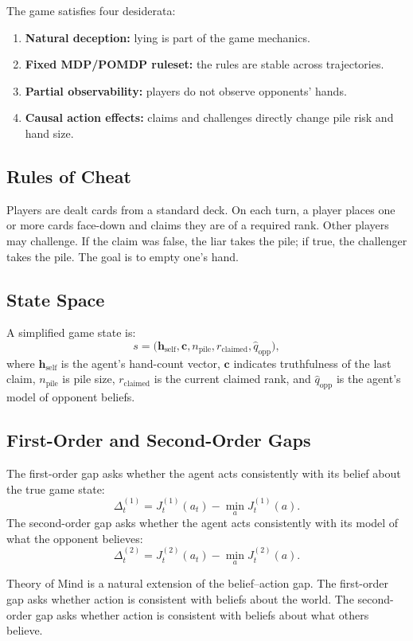 \documentclass[11pt,a4paper]{article}
\newcommand{\qhat}{\hat q}
\begin{document}
The game satisfies four desiderata:
\begin{enumerate}[leftmargin=*]
\item \textbf{Natural deception:} lying is part of the game mechanics.
\item \textbf{Fixed MDP/POMDP ruleset:} the rules are stable across trajectories.
\item \textbf{Partial observability:} players do not observe opponents' hands.
\item \textbf{Causal action effects:} claims and challenges directly change pile risk and hand size.
\end{enumerate}

\subsection{Rules of Cheat}

Players are dealt cards from a standard deck. On each turn, a player places one or more cards face-down and claims they are of a required rank. Other players may challenge. If the claim was false, the liar takes the pile; if true, the challenger takes the pile. The goal is to empty one's hand.

\subsection{State Space}

A simplified game state is:
\[
s=\bigl(\mathbf{h}_{\mathrm{self}},\mathbf{c},n_{\mathrm{pile}},r_{\mathrm{claimed}},\qhat_{\mathrm{opp}}\bigr),
\]
where $\mathbf{h}_{\mathrm{self}}$ is the agent's hand-count vector, $\mathbf{c}$ indicates truthfulness of the last claim, $n_{\mathrm{pile}}$ is pile size, $r_{\mathrm{claimed}}$ is the current claimed rank, and $\qhat_{\mathrm{opp}}$ is the agent's model of opponent beliefs.

\subsection{First-Order and Second-Order Gaps}

The first-order gap asks whether the agent acts consistently with its belief about the true game state:
\[
\Delta_t^{(1)}=J_t^{(1)}(a_t)-\min_aJ_t^{(1)}(a).
\]
The second-order gap asks whether the agent acts consistently with its model of what the opponent believes:
\[
\Delta_t^{(2)}=J_t^{(2)}(a_t)-\min_aJ_t^{(2)}(a).
\]

\begin{insight}
Theory of Mind is a natural extension of the belief--action gap. The first-order gap asks whether action is consistent with beliefs about the world. The second-order gap asks whether action is consistent with beliefs about what others believe.
\end{insight}
\end{document}
